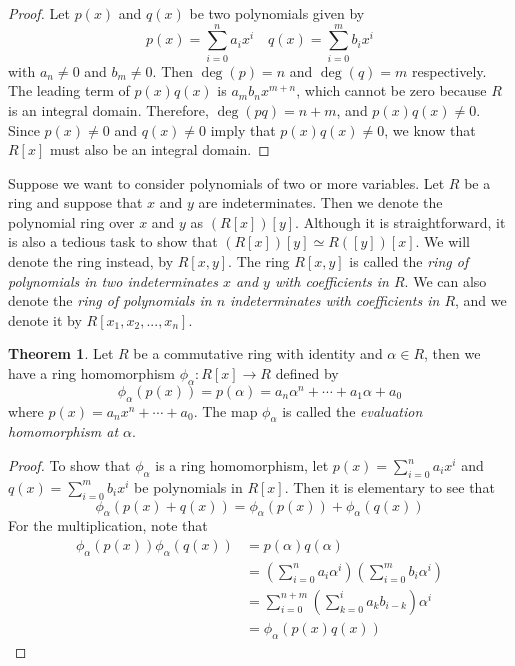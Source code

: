 \documentclass[11pt]{book}
\theoremstyle{definition}\newtheorem{definition}[subsection]{Definition}
\theoremstyle{definition}\newtheorem{example}[subsection]{Example}
\theoremstyle{definition}\newtheorem{notation}[subsection]{Notation}
\theoremstyle{definition}\newtheorem{remark}[subsection]{Remark}
\theoremstyle{theorem}\newtheorem{theorem}[subsection]{Theorem}
\theoremstyle{theorem}\newtheorem{lemma}[subsection]{Lemma}
\theoremstyle{theorem}\newtheorem{proposition}[subsection]{Proposition}
\theoremstyle{theorem}\newtheorem{corollary}[subsection]{Corollary}
\begin{document}
\begin{proof}
    Let $p(x)$ and $q(x)$ be two polynomials given by
    \begin{equation*}
        p(x) = \sum_{i = 0}^{n} a_ix^i \quad q(x) = \sum_{i = 0}^{m} b_ix^i
    \end{equation*}
    with $a_n \neq 0$ and $b_m \neq 0$. Then $\deg(p) = n$ and $\deg(q) = m$ respectively. The leading term of $p(x)q(x)$ is $a_mb_nx^{m + n}$, which cannot be zero because $R$ is an integral domain. Therefore, $\deg(pq) = n + m$, and $p(x)q(x) \neq 0$. Since $p(x) \neq 0$ and $q(x) \neq 0$ imply that $p(x)q(x) \neq 0$, we know that $R[x]$ must also be an integral domain.
\end{proof}

Suppose we want to consider polynomials of two or more variables. Let $R$ be a ring and suppose that $x$ and $y$ are indeterminates. Then we denote the polynomial ring over $x$ and $y$ as $(R[x])[y]$. Although it is straightforward, it is also a tedious task to show that $(R[x])[y] \simeq R([y])[x]$. We will denote the ring instead, by $R[x, y]$. The ring $R[x, y]$ is called the \emph{ring of polynomials in two indeterminates $x$ and $y$ with coefficients in $R$}. We can also denote the \emph{ring of polynomials in $n$ indeterminates with coefficients in $R$}, and we denote it by $R[x_1, x_2,..., x_n]$.  

\begin{theorem}\label{theorem:2.1.13}
    Let $R$ be a commutative ring with identity and $\alpha \in R$, then we have a ring homomorphism $\phi_{\alpha} : R[x] \to R$ defined by
    \begin{equation*}
        \phi_{\alpha}(p(x)) = p(\alpha) = a_n\alpha^n + \cdots + a_1\alpha + a_0
    \end{equation*}
    where $p(x) = a_nx^n + \cdots + a_0$. The map $\phi_{\alpha}$ is called the \emph{evaluation homomorphism at $\alpha$}. 
\end{theorem}

\begin{proof}
    To show that $\phi_{\alpha}$ is a ring homomorphism, let $p(x) = \sum_{i = 0}^{n} a_ix^i$ and $q(x) = \sum_{i = 0}^{m} b_ix^i$ be polynomials in $R[x]$. Then it is elementary to see that
    \begin{equation*}
        \phi_{\alpha}(p(x) + q(x)) = \phi_{\alpha}(p(x)) + \phi_{\alpha}(q(x))
    \end{equation*}
    For the multiplication, note that
    \begin{align*}
        \phi_{\alpha}(p(x))\phi_{\alpha}(q(x)) &= p(\alpha)q(\alpha) \\
        &= \left(\sum_{i = 0}^{n} a_i\alpha^i\right)\left(\sum_{i = 0}^{m} b_i\alpha^i\right) \\
        &= \sum_{i = 0}^{n + m} \left(\sum_{k = 0}^{i} a_k b_{i - k}\right) \alpha^i \\
        &= \phi_{\alpha}(p(x)q(x))
    \end{align*}
\end{proof}

\printindex
\end{document}
